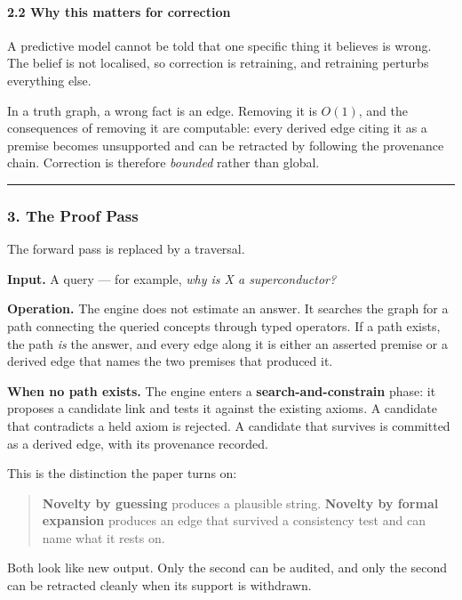\documentclass[
  11pt,
  a4paper,
]{article}
\begin{document}
\paragraph{2.2 Why this matters for
correction}\label{why-this-matters-for-correction}

A predictive model cannot be told that one specific thing it believes is
wrong. The belief is not localised, so correction is retraining, and
retraining perturbs everything else.

In a truth graph, a wrong fact is an edge. Removing it is \(O(1)\), and
the consequences of removing it are computable: every derived edge
citing it as a premise becomes unsupported and can be retracted by
following the provenance chain. Correction is therefore \emph{bounded}
rather than global.

\begin{center}\rule{0.5\linewidth}{0.5pt}\end{center}

\subsubsection{3. The Proof Pass}\label{the-proof-pass}

The forward pass is replaced by a traversal.

\textbf{Input.} A query --- for example, \emph{why is X a
superconductor?}

\textbf{Operation.} The engine does not estimate an answer. It searches
the graph for a path connecting the queried concepts through typed
operators. If a path exists, the path \emph{is} the answer, and every
edge along it is either an asserted premise or a derived edge that names
the two premises that produced it.

\textbf{When no path exists.} The engine enters a
\textbf{search-and-constrain} phase: it proposes a candidate link and
tests it against the existing axioms. A candidate that contradicts a
held axiom is rejected. A candidate that survives is committed as a
derived edge, with its provenance recorded.

This is the distinction the paper turns on:

\begin{quote}
\textbf{Novelty by guessing} produces a plausible string.
\textbf{Novelty by formal expansion} produces an edge that survived a
consistency test and can name what it rests on.
\end{quote}

Both look like new output. Only the second can be audited, and only the
second can be retracted cleanly when its support is withdrawn.
\end{document}
